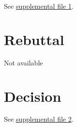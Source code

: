 \documentclass[twocolumn,  rga,issue, numeric]{jote-new-article}
\begin{document}
See \href{https://jtrialerror.com/assets/supplements/rga5/Valentini-Reviewers-Comments.pdf}{supplemental file 1}.

\section{Rebuttal}

Not available


\section{Decision}


See \href{https://jtrialerror.com/assets/supplements/rga5/Valentini-Decision.pdf}{supplemental file 2}.

\nocite{*}

\printbibliography

\balance
\end{document}
